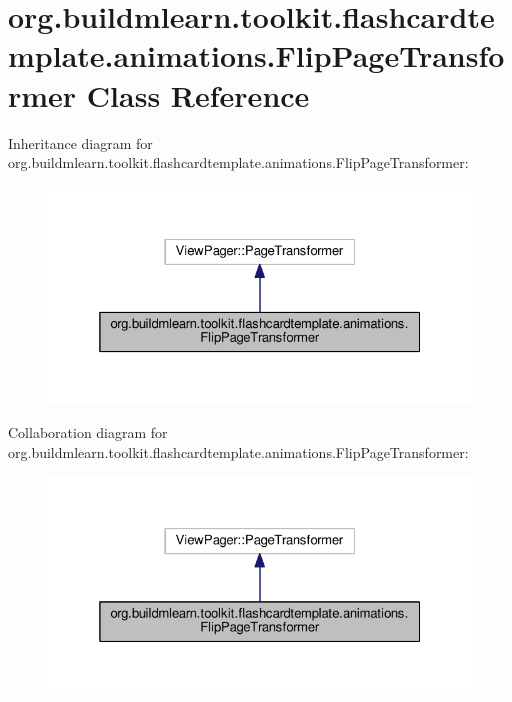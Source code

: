 \hypertarget{classorg_1_1buildmlearn_1_1toolkit_1_1flashcardtemplate_1_1animations_1_1FlipPageTransformer}{}\section{org.\+buildmlearn.\+toolkit.\+flashcardtemplate.\+animations.\+Flip\+Page\+Transformer Class Reference}
\label{classorg_1_1buildmlearn_1_1toolkit_1_1flashcardtemplate_1_1animations_1_1FlipPageTransformer}


Inheritance diagram for org.\+buildmlearn.\+toolkit.\+flashcardtemplate.\+animations.\+Flip\+Page\+Transformer\+:
\nopagebreak
\begin{figure}[H]
\begin{center}
\leavevmode
\includegraphics[width=325pt]{classorg_1_1buildmlearn_1_1toolkit_1_1flashcardtemplate_1_1animations_1_1FlipPageTransformer__inherit__graph}
\end{center}
\end{figure}


Collaboration diagram for org.\+buildmlearn.\+toolkit.\+flashcardtemplate.\+animations.\+Flip\+Page\+Transformer\+:
\nopagebreak
\begin{figure}[H]
\begin{center}
\leavevmode
\includegraphics[width=325pt]{classorg_1_1buildmlearn_1_1toolkit_1_1flashcardtemplate_1_1animations_1_1FlipPageTransformer__coll__graph}
\end{center}
\end{figure}
